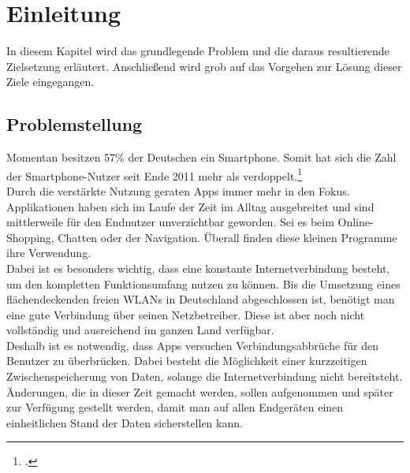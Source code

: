 \chapter{Einleitung}
\label{cha:einleitung}
In diesem Kapitel wird das grundlegende Problem und die daraus resultierende Zielsetzung erläutert. Anschließend wird grob auf das Vorgehen zur Lösung dieser Ziele eingegangen.

\section{Problemstellung}
\label{sec:problemstellung}
Momentan besitzen 57\% der Deutschen ein Smartphone. Somit hat sich die Zahl der Smartphone-Nutzer seit Ende 2011 mehr als verdoppelt.\footcite{Statista-SmartphoneNutzung}\\
Durch die verstärkte Nutzung geraten \glspl{App} immer mehr in den Fokus. Applikationen haben sich im Laufe der Zeit im Alltag ausgebreitet und sind mittlerweile für den Endnutzer unverzichtbar geworden. Sei es beim Online-Shopping, Chatten oder der Navigation. Überall finden diese kleinen Programme ihre Verwendung.\\
Dabei ist es besonders wichtig, dass eine konstante Internetverbindung besteht, um den kompletten Funktionsumfang nutzen zu können. Bis die Umsetzung eines flächendeckenden freien \ac{WLAN}s in Deutschland abgeschlossen ist, benötigt man eine gute Verbindung über seinen Netzbetreiber. Diese ist aber noch nicht vollständig und ausreichend im ganzen Land verfügbar.\\
Deshalb ist es notwendig, dass \glspl{App} versuchen Verbindungsabbrüche für den Benutzer zu überbrücken. Dabei besteht die Möglichkeit einer kurzzeitigen Zwischenspeicherung von Daten, solange die Internetverbindung nicht bereitsteht. Änderungen, die in dieser Zeit gemacht werden, sollen aufgenommen und später zur Verfügung gestellt werden, damit man auf allen Endgeräten einen einheitlichen Stand der Daten sicherstellen kann.

